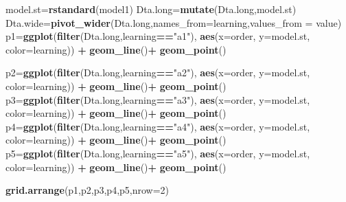 \documentclass[
]{article}
\newenvironment{Shaded}{\begin{snugshade}}{\end{snugshade}}
\newcommand{\DataTypeTok}[1]{\textcolor[rgb]{0.13,0.29,0.53}{#1}}
\newcommand{\DecValTok}[1]{\textcolor[rgb]{0.00,0.00,0.81}{#1}}
\newcommand{\KeywordTok}[1]{\textcolor[rgb]{0.13,0.29,0.53}{\textbf{#1}}}
\newcommand{\NormalTok}[1]{#1}
\newcommand{\OperatorTok}[1]{\textcolor[rgb]{0.81,0.36,0.00}{\textbf{#1}}}
\newcommand{\StringTok}[1]{\textcolor[rgb]{0.31,0.60,0.02}{#1}}
\begin{document}
\begin{Shaded}
\begin{Highlighting}[]
\NormalTok{model.st=}\KeywordTok{rstandard}\NormalTok{(model1)}
\NormalTok{Dta.long=}\KeywordTok{mutate}\NormalTok{(Dta.long,model.st)}
\NormalTok{Dta.wide=}\KeywordTok{pivot_wider}\NormalTok{(Dta.long,}\DataTypeTok{names_from=}\NormalTok{learning,}\DataTypeTok{values_from =}\NormalTok{ value)}
\NormalTok{  p1=}\KeywordTok{ggplot}\NormalTok{(}\KeywordTok{filter}\NormalTok{(Dta.long,learning}\OperatorTok{==}\StringTok{"a1"}\NormalTok{), }\KeywordTok{aes}\NormalTok{(}\DataTypeTok{x=}\NormalTok{order, }\DataTypeTok{y=}\NormalTok{model.st, }\DataTypeTok{color=}\NormalTok{learning)) }\OperatorTok{+}
\StringTok{  }\KeywordTok{geom_line}\NormalTok{()}\OperatorTok{+}
\StringTok{  }\KeywordTok{geom_point}\NormalTok{() }

\NormalTok{  p2=}\KeywordTok{ggplot}\NormalTok{(}\KeywordTok{filter}\NormalTok{(Dta.long,learning}\OperatorTok{==}\StringTok{"a2"}\NormalTok{), }\KeywordTok{aes}\NormalTok{(}\DataTypeTok{x=}\NormalTok{order, }\DataTypeTok{y=}\NormalTok{model.st, }\DataTypeTok{color=}\NormalTok{learning)) }\OperatorTok{+}
\StringTok{  }\KeywordTok{geom_line}\NormalTok{()}\OperatorTok{+}
\StringTok{  }\KeywordTok{geom_point}\NormalTok{() }
\NormalTok{  p3=}\KeywordTok{ggplot}\NormalTok{(}\KeywordTok{filter}\NormalTok{(Dta.long,learning}\OperatorTok{==}\StringTok{"a3"}\NormalTok{), }\KeywordTok{aes}\NormalTok{(}\DataTypeTok{x=}\NormalTok{order, }\DataTypeTok{y=}\NormalTok{model.st, }\DataTypeTok{color=}\NormalTok{learning)) }\OperatorTok{+}
\StringTok{  }\KeywordTok{geom_line}\NormalTok{()}\OperatorTok{+}
\StringTok{  }\KeywordTok{geom_point}\NormalTok{() }
\NormalTok{  p4=}\KeywordTok{ggplot}\NormalTok{(}\KeywordTok{filter}\NormalTok{(Dta.long,learning}\OperatorTok{==}\StringTok{"a4"}\NormalTok{), }\KeywordTok{aes}\NormalTok{(}\DataTypeTok{x=}\NormalTok{order, }\DataTypeTok{y=}\NormalTok{model.st, }\DataTypeTok{color=}\NormalTok{learning)) }\OperatorTok{+}
\StringTok{  }\KeywordTok{geom_line}\NormalTok{()}\OperatorTok{+}
\StringTok{  }\KeywordTok{geom_point}\NormalTok{() }
\NormalTok{  p5=}\KeywordTok{ggplot}\NormalTok{(}\KeywordTok{filter}\NormalTok{(Dta.long,learning}\OperatorTok{==}\StringTok{"a5"}\NormalTok{), }\KeywordTok{aes}\NormalTok{(}\DataTypeTok{x=}\NormalTok{order, }\DataTypeTok{y=}\NormalTok{model.st, }\DataTypeTok{color=}\NormalTok{learning)) }\OperatorTok{+}
\StringTok{  }\KeywordTok{geom_line}\NormalTok{()}\OperatorTok{+}
\StringTok{  }\KeywordTok{geom_point}\NormalTok{() }

\KeywordTok{grid.arrange}\NormalTok{(p1,p2,p3,p4,p5,}\DataTypeTok{nrow=}\DecValTok{2}\NormalTok{)}
\end{Highlighting}
\end{Shaded}
\end{document}
